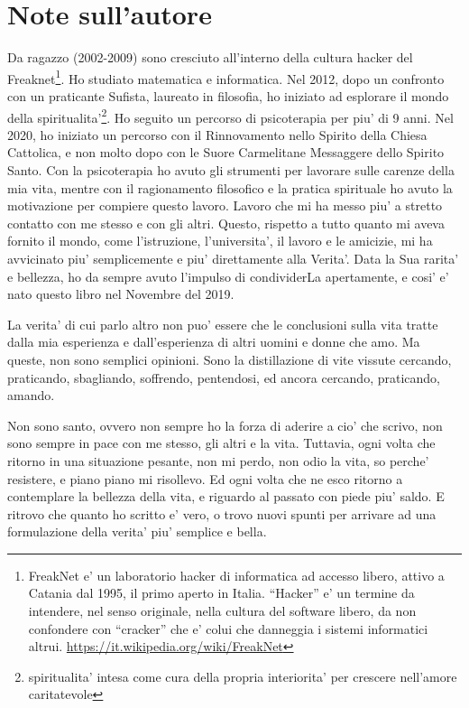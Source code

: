 
\chapter{Note sull'autore}

Da ragazzo (2002-2009) sono cresciuto all'interno della cultura hacker del Freaknet\footnote{FreakNet e' un laboratorio hacker di informatica ad accesso libero, attivo a Catania dal 1995, il primo aperto in Italia. ``Hacker'' e' un termine da intendere, nel senso originale, nella cultura del software libero, da non confondere con ``cracker'' che e' colui che danneggia i sistemi informatici altrui.  \url{https://it.wikipedia.org/wiki/FreakNet}}.
Ho studiato matematica e informatica. Nel 2012, dopo un confronto con un praticante Sufista, laureato in filosofia, ho iniziato ad esplorare il mondo della spiritualita'\footnote{spiritualita' intesa come cura della propria interiorita' per crescere nell'amore caritatevole}. Ho seguito un percorso di psicoterapia per piu' di 9 anni. Nel 2020, ho iniziato un percorso con il Rinnovamento nello Spirito della Chiesa Cattolica, e non molto dopo con le Suore Carmelitane Messaggere dello Spirito Santo. Con la psicoterapia ho avuto gli strumenti per lavorare sulle carenze della mia vita, mentre con il ragionamento filosofico e la pratica spirituale ho avuto la motivazione per compiere questo lavoro. Lavoro che mi ha messo piu' a stretto contatto con me stesso e con gli altri. Questo, rispetto a tutto quanto mi aveva fornito il mondo, come l'istruzione, l'universita', il lavoro e le amicizie, mi ha avvicinato piu' semplicemente e piu' direttamente alla Verita'. Data la Sua rarita' e bellezza, ho da sempre avuto l'impulso di condividerLa apertamente, e cosi' e' nato questo libro nel Novembre del 2019.

La verita' di cui parlo altro non puo' essere che le conclusioni sulla vita tratte dalla mia esperienza e dall'esperienza di altri uomini e donne che amo. Ma queste, non sono semplici opinioni. Sono la distillazione di vite vissute cercando, praticando, sbagliando, soffrendo, pentendosi, ed ancora cercando, praticando, amando.

Non sono santo, ovvero non sempre ho la forza di aderire a cio' che scrivo, non sono sempre in pace con me stesso, gli altri e la vita. Tuttavia, ogni volta che ritorno in una situazione pesante, non mi perdo, non odio la vita, so perche' resistere, e piano piano mi risollevo. Ed ogni volta che ne esco ritorno a contemplare la bellezza della vita, e riguardo al passato con piede piu' saldo. E ritrovo che quanto ho scritto e' vero, o trovo nuovi spunti per arrivare ad una formulazione della verita' piu' semplice e bella. 

